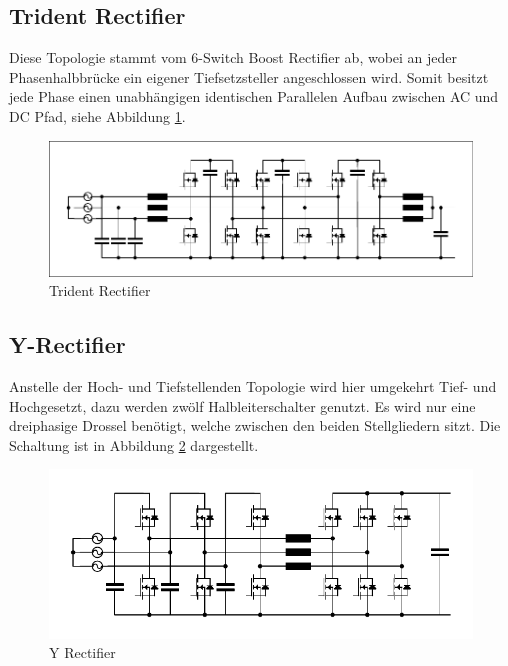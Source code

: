 	\subsection{Trident Rectifier}
		Diese Topologie stammt vom 6-Switch Boost Rectifier ab, wobei an jeder Phasenhalbbrücke ein eigener Tiefsetzsteller angeschlossen wird. Somit besitzt jede Phase einen unabhängigen identischen Parallelen Aufbau zwischen AC und DC Pfad, siehe Abbildung \ref{fig:trident}. 
		\begin{figure}
			\centering
			\includegraphics[width=0.7\linewidth]{content/Grafiken/Trident}
			\caption{Trident Rectifier}
			\label{fig:trident}
		\end{figure}
		
	\subsection{Y-Rectifier}
		Anstelle der Hoch- und Tiefstellenden Topologie wird hier umgekehrt Tief- und Hochgesetzt, dazu werden zwölf Halbleiterschalter genutzt. Es wird nur eine dreiphasige Drossel benötigt, welche zwischen den beiden Stellgliedern sitzt. Die Schaltung ist in Abbildung \ref{fig:y-rectifier} dargestellt.
		
	
		\begin{figure}
			\centering
			\includegraphics[width=0.7\linewidth]{content/Grafiken/Y-Rectifier}
			\caption{Y Rectifier}
			\label{fig:y-rectifier}
		\end{figure}

